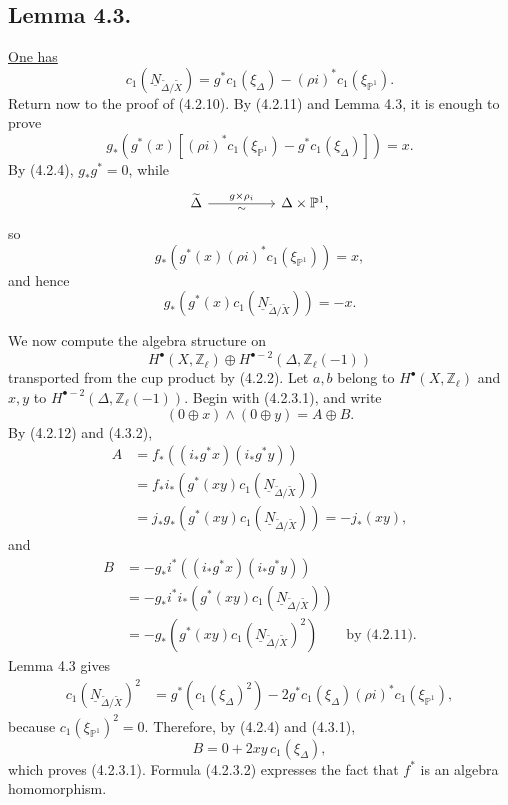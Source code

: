 \subsection*{Lemma 4.3.}
\underline{One has}
\[
c_1(\underline N_{\widetilde\Delta/\widetilde X})
=g^*c_1(\xi_\Delta)-(\rho i)^*c_1(\xi_{\mathbb P^1}).
\]
Return now to the proof of (4.2.10).  By (4.2.11) and Lemma 4.3, it is enough
to prove
\[
g_*\!\left(g^*(x)\left[(\rho i)^*c_1(\xi_{\mathbb P^1})
                       -g^*c_1(\xi_\Delta)\right]\right)=x.
\]
By (4.2.4), $g_*g^*=0$, while
\[
\begin{tikzcd}[column sep=huge]
\widetilde\Delta\arrow[r,"g\times\rho_i","\sim"']
  &\Delta\times\mathbb P^1,
\end{tikzcd}
\]
so
\begin{equation}\tag{4.3.1}
g_*\!\left(g^*(x)(\rho i)^*c_1(\xi_{\mathbb P^1})\right)=x,
\end{equation}
and hence
\begin{equation}\tag{4.3.2}
g_*\!\left(g^*(x)c_1(\underline N_{\widetilde\Delta/\widetilde X})\right)
=-x.
\end{equation}

We now compute the algebra structure on
\[
H^\bullet(X,\mathbb Z_\ell)\oplus
H^{\bullet-2}(\Delta,\mathbb Z_\ell(-1))
\]
transported from the cup product by (4.2.2).  Let $a,b$ belong to
$H^\bullet(X,\mathbb Z_\ell)$ and $x,y$ to
$H^{\bullet-2}(\Delta,\mathbb Z_\ell(-1))$.  Begin with (4.2.3.1), and write
\[
(0\oplus x)\wedge(0\oplus y)=A\oplus B.
\]
By (4.2.12) and (4.3.2),
\[
\begin{aligned}
A
&=f_*\!\left((i_*g^*x)(i_*g^*y)\right)\\
&=f_*i_*\!\left(g^*(xy)c_1(\underline N_{\widetilde\Delta/\widetilde X})\right)\\
&=j_*g_*\!\left(g^*(xy)c_1(\underline N_{\widetilde\Delta/\widetilde X})\right)
=-j_*(xy),
\end{aligned}
\]
and
\[
\begin{aligned}
B
&=-g_*i^*\!\left((i_*g^*x)(i_*g^*y)\right)\\
&=-g_*i^*i_*\!\left(g^*(xy)c_1(\underline N_{\widetilde\Delta/\widetilde X})\right)\\
&=-g_*\!\left(g^*(xy)c_1(\underline N_{\widetilde\Delta/\widetilde X})^2\right)
\qquad\text{by (4.2.11)}.
\end{aligned}
\]
Lemma 4.3 gives
\[
\begin{aligned}
c_1(\underline N_{\widetilde\Delta/\widetilde X})^2
&=g^*\!\left(c_1(\xi_\Delta)^2\right)
 -2g^*c_1(\xi_\Delta)(\rho i)^*c_1(\xi_{\mathbb P^1}),
\end{aligned}
\]
because $c_1(\xi_{\mathbb P^1})^2=0$.  Therefore, by (4.2.4) and (4.3.1),
\[
B=0+2xy\,c_1(\xi_\Delta),
\]
which proves (4.2.3.1).  Formula (4.2.3.2) expresses the fact that $f^*$ is
an algebra homomorphism.

